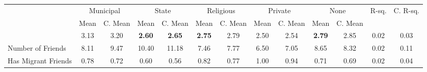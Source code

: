 \begin{tabular}{l c c c c c c c c c c c c}
\toprule
& \multicolumn{2}{c}{Municipal} & \multicolumn{2}{c}{State} & \multicolumn{2}{c}{Religious} & \multicolumn{2}{c}{Private} & \multicolumn{2}{c}{None} & R-sq. & C. R-sq. \\
& \scriptsize Mean & \scriptsize C. Mean & \scriptsize Mean & \scriptsize C. Mean & \scriptsize Mean & \scriptsize C. Mean & \scriptsize Mean & \scriptsize C. Mean & \scriptsize Mean & \scriptsize C. Mean & & \\
\midrule
&      3.13 & 3.20 & \textbf{     2.60} & \textbf{     2.65} & \textbf{     2.75} & 2.79 &      2.50 & 2.54 & \textbf{     2.79} & 2.85 &      0.02 &      0.03 \\
Number of Friends &      8.11 & 9.47 &     10.40 & 11.18 &      7.46 & 7.77 &      6.50 & 7.05 &      8.65 & 8.32 &      0.02 &      0.11 \\
Has Migrant Friends &      0.78 & 0.72 &      0.60 & 0.56 &      0.82 & 0.77 &      1.00 & 0.94 &      0.71 & 0.69 &      0.02 &      0.04 \\
\bottomrule
\end{tabular}
